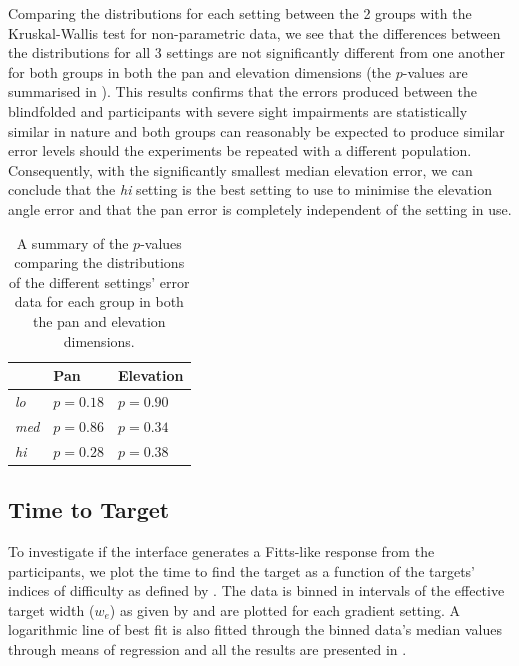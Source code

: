 \documentclass[]{interact}
\begin{document}
Comparing the distributions for each setting between the 2 groups with the Kruskal-Wallis test for non-parametric data, we see that the differences between the distributions for all 3 settings are not significantly different from one another for both groups in both the pan and elevation dimensions (the $p$-values are summarised in ).
This results confirms that the errors produced between the blindfolded and participants with severe sight impairments are statistically similar in nature and both groups can reasonably be expected to produce similar error levels should the experiments be repeated with a different population. 
Consequently, with the significantly smallest median elevation error, we can conclude that the \textit{hi} setting is the best setting to use to minimise the elevation angle error and that the pan error is completely independent of the setting in use. 

\begin{table}
  \centering
  \caption{A summary of the $p$-values comparing the distributions of the different settings' error data for each group in both the pan and elevation dimensions. }\label{tab:inter-group-results}
  \begin{tabular}{lll}
    \toprule
                   & Pan      & Elevation \\ \midrule
      \textit{lo}  & $p=0.18$ & $p=0.90$  \\
      \textit{med} & $p=0.86$ & $p=0.34$  \\
      \textit{hi}  & $p=0.28$ & $p=0.38$  \\
    \bottomrule
  \end{tabular}
\end{table}

\subsection{Time to Target}

To investigate if the interface generates a Fitts-like response from the participants, we plot the time to find the target as a function of the targets' indices of difficulty as defined by .
The data is binned in intervals of the effective target width ($w_e$) as given by  and are plotted for each gradient setting. 
A logarithmic line of best fit is also fitted through the binned data's median values through means of regression and all the results are presented in .
\end{document}
